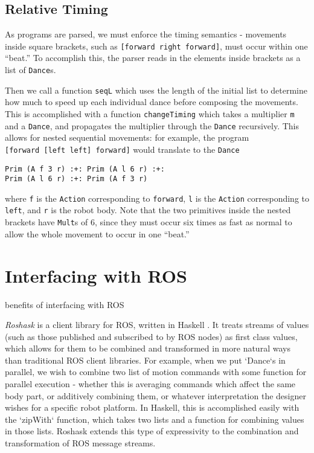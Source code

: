 \documentclass[sigconf]{acmart}
\begin{document}
\subsection{Relative Timing}\label{relative-timing}

As programs are parsed, we must enforce the timing semantics - movements
inside square brackets, such as \texttt{{[}forward\ right\ forward{]}},
must occur within one ``beat.'' To accomplish this, the parser reads in
the elements inside brackets as a list of \texttt{Dance}s.

Then we call a function \texttt{seqL} which uses the length of the
initial list to determine how much to speed up each individual dance
before composing the movements. This is accomplished with a function
\texttt{changeTiming} which takes a multiplier \texttt{m} and a
\texttt{Dance}, and propagates the multiplier through the \texttt{Dance}
recursively. This allows for nested sequential movements: for example,
the program \texttt{{[}forward\ {[}left\ left{]}\ forward{]}} would
translate to the \texttt{Dance}

\begin{verbatim}
Prim (A f 3 r) :+: Prim (A l 6 r) :+: 
Prim (A l 6 r) :+: Prim (A f 3 r)
\end{verbatim}

where \texttt{f} is the \texttt{Action} corresponding to
\texttt{forward}, \texttt{l} is the \texttt{Action} corresponding to
\texttt{left}, and \texttt{r} is the robot body. Note that the two
primitives inside the nested brackets have \texttt{Mult}s of 6, since
they must occur six times as fast as normal to allow the whole movement
to occur in one ``beat.''

\section{Interfacing with ROS}\label{interfacing-with-ros}

{\color{red}benefits of interfacing with ROS}

\emph{Roshask} is a client library for ROS, written in Haskell
\cite{cowley2011stream}. It treats streams of values (such as those published
and subscribed to by ROS nodes) as first class values, which allows for them to
be combined and transformed in more natural ways than traditional ROS client
libraries. For example, when we put `Dance`s in parallel, we wish to combine two
list of motion commands with some function for parallel execution - whether this
is averaging commands which affect the same body part, or additively combining
them, or whatever interpretation the designer wishes for a specific robot
platform. In Haskell, this is accomplished easily with the
`zipWith` function, which takes two lists and a function for combining values in
those lists. Roshask extends this type of expressivity to the combination and
transformation of ROS message streams.
\end{document}
